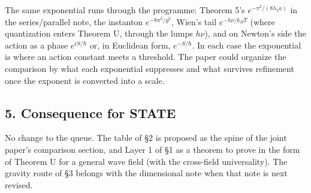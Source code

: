\documentclass[11pt,a4paper]{article}
\begin{document}
The same exponential runs through the programme: Theorem 5's
\(e^{-\pi^2/(8\lambda_3a)}\) in the series/parallel note, the instanton
\(e^{-8\pi^2/g^2}\), Wien's tail \(e^{-h\nu/k_BT}\) (where quantization
enters Theorem U, through the lumps \(h\nu\)), and on Newton's side the
action as a phase \(e^{iS/\hbar}\) or, in Euclidean form,
\(e^{-S/\hbar}\). In each case the exponential is where an action
constant meets a threshold. The paper could organize the comparison by
what each exponential suppresses and what survives refinement once the
exponent is converted into a scale.

\hypertarget{consequence-for-state}{%
\subsection{5. Consequence for STATE}\label{consequence-for-state}}

No change to the queue. The table of §2 is proposed as the spine of the
joint paper's comparison section, and Layer 1 of §1 as a theorem to
prove in the form of Theorem U for a general wave field (with the
cross-field universality). The gravity route of §3 belongs with the
dimensional note when that note is next revised.
\end{document}
